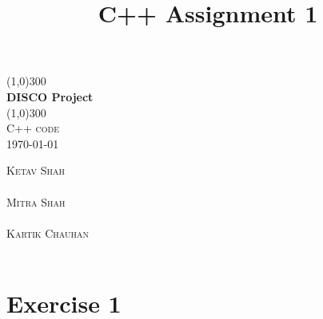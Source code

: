 \documentclass{article}
\title{C++ Assignment 1}
\begin{document}
\begin{titlepage}
	\begin{center}
    \line(1,0){300}\\
    [0.65cm]
	\huge{\bfseries DISCO Project}\\
	\line(1,0){300}\\
	\textsc{\Large C++ code}\\
	\textsc{\LARGE \today}\\
	[5.5cm]     
	\end{center}
	\begin{flushright}
		\textsc{\Large Ketav Shah\\}\\
		[0.5cm]
		\textsc{\Large Mitra Shah\\}\\
		[0.5cm]
  \textsc{\Large Kartik Chauhan\\}\\
		[0.5cm]
	\end{flushright}
\end{titlepage}

\section*{Exercise 1}
\end{document}

